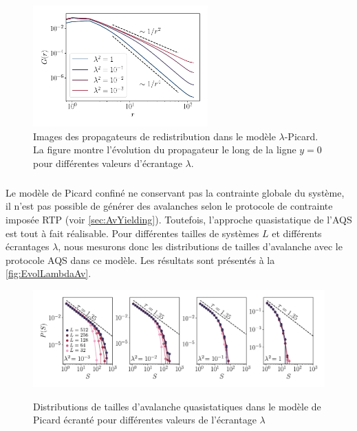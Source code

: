 \begin{figure}[h]
	\centering
	\includegraphics[width=0.6\textwidth]{Chapitre6/Figures/ScreenedPropagators.pdf}
	\caption{Images des propagateurs de redistribution dans le modèle $\lambda$-Picard. La figure montre l'évolution du propagateur le long de la ligne $y=0$ pour différentes valeurs d'écrantage $\lambda$.}
	\label{fig:screenedprop}
\end{figure}

\subparagraph{}Le modèle de Picard confiné ne conservant pas la contrainte globale du système, il n'est pas possible de générer des avalanches selon le protocole de contrainte imposée RTP (voir \autoref{sec:AvYielding}). Toutefois, l'approche quasistatique de l'AQS est tout à fait réalisable. Pour différentes tailles de systèmes $L$ et différents écrantages $\lambda$, nous mesurons donc les distributions de tailles d'avalanche avec le protocole AQS dans ce modèle. Les résultats sont présentés à la \autoref{fig:EvolLambdaAv}.

\begin{figure}[h]
	\centering
	\includegraphics[width=\textwidth]{Chapitre4/Figures/Avalanches/EvolLambdaAv.pdf}
	\label{fig:EvolLambdaAv}
	\caption{Distributions de tailles d'avalanche quasistatiques dans le modèle de Picard écranté pour différentes valeurs de l'écrantage $\lambda$}
\end{figure}

